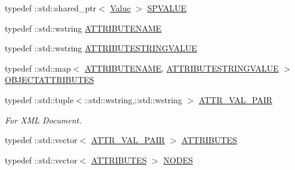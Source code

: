 \begin{DoxyCompactItemize}
\item 
typedef \+::std\+::shared\+\_\+ptr$<$ \hyperlink{class_n_m_1_1_o_d_b_1_1_value}{Value} $>$ \hyperlink{namespace_n_m_1_1_o_d_b_a76ab348a70a5cf877035b8281bdd3f7b}{S\+P\+V\+A\+L\+U\+E}
\item 
typedef \+::std\+::wstring \hyperlink{namespace_n_m_1_1_o_d_b_ab49df7074ab35e6849b911f49296fc6d}{A\+T\+T\+R\+I\+B\+U\+T\+E\+N\+A\+M\+E}
\item 
typedef \+::std\+::wstring \hyperlink{namespace_n_m_1_1_o_d_b_a10ebd904480d7e3c24aae1b9a541244f}{A\+T\+T\+R\+I\+B\+U\+T\+E\+S\+T\+R\+I\+N\+G\+V\+A\+L\+U\+E}
\item 
typedef \+::std\+::map$<$ \hyperlink{namespace_n_m_1_1_o_d_b_ab49df7074ab35e6849b911f49296fc6d}{A\+T\+T\+R\+I\+B\+U\+T\+E\+N\+A\+M\+E}, \hyperlink{namespace_n_m_1_1_o_d_b_a10ebd904480d7e3c24aae1b9a541244f}{A\+T\+T\+R\+I\+B\+U\+T\+E\+S\+T\+R\+I\+N\+G\+V\+A\+L\+U\+E} $>$ \hyperlink{namespace_n_m_1_1_o_d_b_a8770283da9792324e1afe8104d40123b}{O\+B\+J\+E\+C\+T\+A\+T\+T\+R\+I\+B\+U\+T\+E\+S}
\item 
typedef \+::std\+::tuple$<$\+::std\+::wstring,\+::std\+::wstring $>$ \hyperlink{namespace_n_m_1_1_o_d_b_a29a75b5b2c58f9f06906435b0cfbe0bc}{A\+T\+T\+R\+\_\+\+V\+A\+L\+\_\+\+P\+A\+I\+R}
\begin{DoxyCompactList}\small\item\em For X\+M\+L Document. \end{DoxyCompactList}\item 
typedef \+::std\+::vector$<$ \hyperlink{namespace_n_m_1_1_o_d_b_a29a75b5b2c58f9f06906435b0cfbe0bc}{A\+T\+T\+R\+\_\+\+V\+A\+L\+\_\+\+P\+A\+I\+R} $>$ \hyperlink{namespace_n_m_1_1_o_d_b_a1e2d4b975f511d2c5c16056f39548b52}{A\+T\+T\+R\+I\+B\+U\+T\+E\+S}
\item 
typedef \+::std\+::vector$<$ \hyperlink{namespace_n_m_1_1_o_d_b_a1e2d4b975f511d2c5c16056f39548b52}{A\+T\+T\+R\+I\+B\+U\+T\+E\+S} $>$ \hyperlink{namespace_n_m_1_1_o_d_b_a613699879177c24fa47723325b9be6cb}{N\+O\+D\+E\+S}
\end{DoxyCompactItemize}

